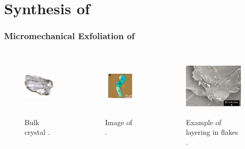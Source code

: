 \documentclass{beamer}
\begin{document}
\section{Synthesis of }
\begin{frame}
\frametitle{Micromechanical Exfoliation of }
\begin{columns}
	\begin{column}{0.31\textwidth}
		\begin{figure}
			\centering
			\includegraphics[height=3cm,width=3cm]{../present_figs/bulkMoS2crystal}
			\caption{Bulk  crystal \cite{Wang2012}.}
		\end{figure}
	\end{column}
	\begin{column}{0.31\textwidth}
		\begin{figure}
			\centering
			\includegraphics[height=3cm, width=3cm]{../present_figs/exfoliation}
			\caption{Image of  \cite{Li2014}.}
		\end{figure}
	\end{column}
	\begin{column}{0.31\textwidth}
		\begin{figure}
			\centering
			\includegraphics[height=3cm, width=3cm]{../present_figs/exfoliatedMoS2}
			\caption{Example of layering in  flakes \cite{SingleLayer2011}.}
		\end{figure}
	\end{column}
\end{columns}
\end{frame}
\end{document}
